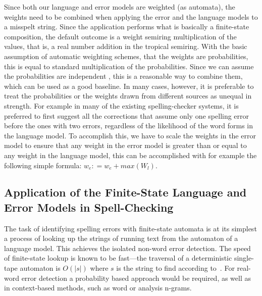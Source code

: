 \documentclass[a4paper,12pt]{article}
\begin{document}
Since both our language and error models are weighted (as automata), the
weights need to be combined when applying the error and the language models to
a misspelt string. Since the application performs what is basically a
finite-state composition, the default outcome is a weight semiring
multiplication of the values, that is, a real number addition in the tropical
semiring. With the basic assumption of automatic weighting schemes, that the
weights are probabilities, this is equal to standard multiplication of the
probabilities. Since we can assume the probabilities are independent
\cite[]{church1991probability}, this is a reasonable way to combine them, which
can be used as a good baseline. In many cases, however, it is preferable to
treat the probabilities or the weights drawn from different sources as unequal
in strength. For example in many of the existing spelling-checker systems, it
is preferred to first suggest all the corrections that assume only one
spelling error before the ones  with two errors, regardless of the likelihood
of the word forms in the language model. To accomplish this, we have to scale
the weights in the error model to ensure that any weight in the error model is
greater than or equal to any weight in the language model, this can be
accomplished with for example the following simple formula: $w_e
\mathrel{\mathop:}= w_e + max(W_l)$.

\subsection{Application of the Finite-State Language and Error Models in
Spell-Checking}

The task of identifying spelling errors with finite-state automata is at its
simplest a process of looking up the strings of running text from the automaton
of a language model. This achieves the isolated non-word error detection. The
speed of finite-state lookup is known to be fast---the traversal of a
deterministic single-tape automaton is $O(|s|)$ where $s$ is the string to find
according to~\cite{aho2007compilers}.  For real-word error detection a
probability based approach would be required, as well as in context-based
methods, such as word or analysis n-grams.
\end{document}
